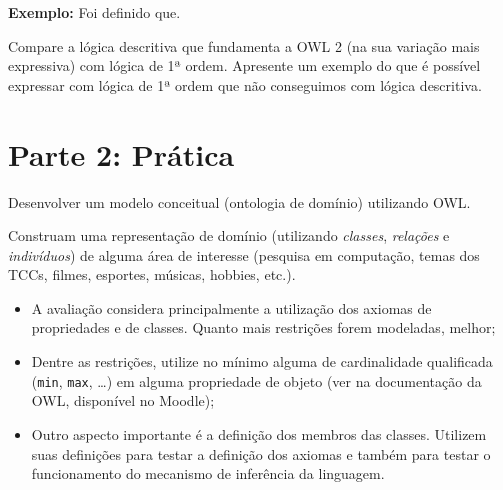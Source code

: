 \documentclass[answers]{exam}
\newcommand{\todo}[1]{{\color{red}{#1}}}
\begin{document}
\begin{questions}
\begin{answer}
\begin{description}
                    \textbf{Exemplo:} Foi definido que.
            \end{description}

            \todo{%
                Exemplificar com elementos do domínio escolhido na parte
                prática.
            }
        \end{answer}

        \question{}
        Compare a lógica descritiva que fundamenta a OWL 2 (na sua variação
        mais expressiva) com lógica de 1ª ordem. Apresente um exemplo do que é
        possível expressar com lógica de 1ª ordem que não conseguimos com
        lógica descritiva.

        \begin{answer}
        \end{answer}
    \end{questions}

    \section{Parte 2: Prática}
    \begin{questions}
        \question{}
        Desenvolver um modelo conceitual (ontologia de domínio) utilizando
        OWL\@.

        Construam uma representação de domínio (utilizando \emph{classes},
        \emph{relações} e \emph{indivíduos}) de alguma área de interesse
        (pesquisa em computação, temas dos TCCs, filmes, esportes, músicas,
        hobbies, etc.).

        \begin{superframe}
            \begin{itemize}
                \item A avaliação considera principalmente a utilização dos
                    axiomas de propriedades e de classes. Quanto mais
                    restrições forem modeladas, melhor;

                \item Dentre as restrições, utilize no mínimo alguma de
                    cardinalidade qualificada (\texttt{min}, \texttt{max},
                    \ldots) em alguma propriedade de objeto (ver na
                    documentação da OWL, disponível no Moodle);

                \item Outro aspecto importante é a definição dos membros das
                    classes. Utilizem suas definições para testar a definição
                    dos axiomas e também para testar o funcionamento do
                    mecanismo de inferência da linguagem.
            \end{itemize}
        \end{superframe}
    \end{questions}

    
    
    \nocite{*}
\end{document}
